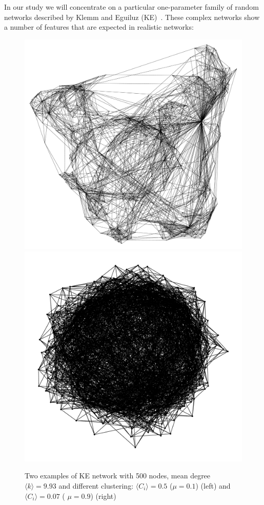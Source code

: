 \documentclass[10pt,letterpaper]{article}
\begin{document}
In our study we will concentrate on a particular one-parameter family
of random networks described by Klemm and Eguiluz (KE)~\cite{Klemm_2002}.
These complex networks show a number of features that are expected in
realistic networks:
\begin{figure}[t!]
\centering
\includegraphics[width=.45\linewidth]{ke_05_09.pdf} \includegraphics[width=.45\linewidth]{ke_05_01.pdf}
\caption{Two examples of KE network with 500 nodes, mean degree \(\langle k \rangle=9.93\) and different clustering: \(\langle C_i \rangle = 0.5\) (\(\mu=0.1\)) (left) and \(\langle C_i \rangle = 0.07\) ( \(\mu=0.9\)) (right)}
\label{fig:networks}
\end{figure}
\end{document}
